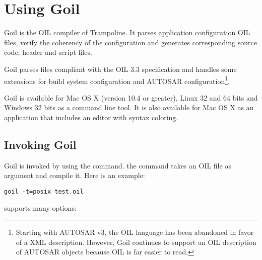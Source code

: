 
\chapter{Using Goil}

Goil is the OIL compiler of Trampoline. It parses application configuration OIL files, verify the coherency of the configuration and generates corresponding source code, header and script files.

Goil parses files compliant with the OIL 3.3 specification and handles some extensions for build system configuration and AUTOSAR configuration\footnote{Starting with AUTOSAR v3, the OIL language has been abandoned in favor of a XML description. However, Goil continues to support an OIL description of AUTOSAR objects because OIL is far easier to read.}.

Goil is available for Mac OS X (version 10.4 or greater), Linux 32 and 64 bits and Windows 32 bits as a command line tool. It is also available for Mac OS X as an application that includes an editor with syntax coloring.

\section{Invoking Goil}

Goil is invoked by using the  command. the  command takes an OIL file as argument and compile it. Here is an example:

\begin{verbatim}
goil -t=posix test.oil
\end{verbatim}

  supports many options: